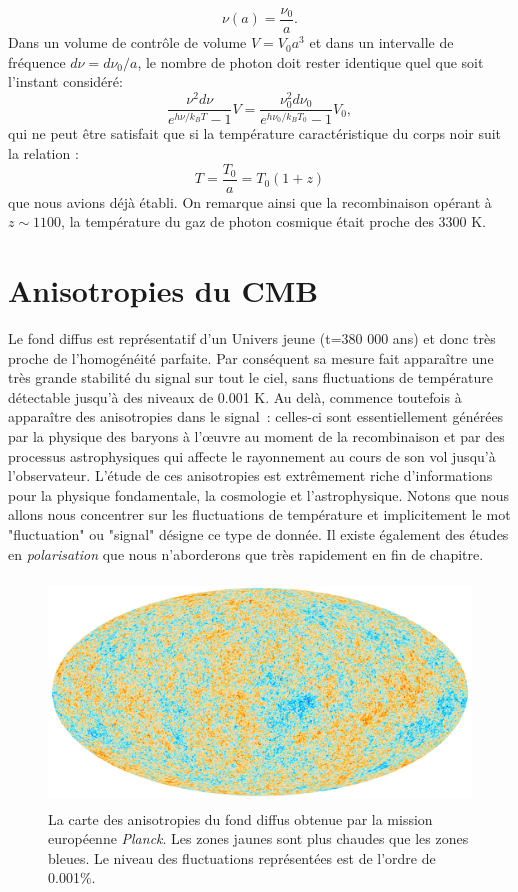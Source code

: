 \begin{equation}
\nu(a)=\frac{\nu_0}{a}.
\end{equation}
Dans un volume de contrôle de volume $V=V_0a^3$ et dans un intervalle de fréquence $d\nu=d\nu_0/a$, le nombre de photon doit rester identique quel que soit l'instant considéré:
\begin{equation}
\frac{\nu^2d\nu}{e^{h\nu/k_BT}-1}V=\frac{\nu_0^2d\nu_0}{e^{h\nu_0/k_BT_0}-1}V_0,
\end{equation}
qui ne peut être satisfait que si la température caractéristique du corps noir suit la relation :
\begin{equation}
T=\frac{T_0}{a}=T_0(1+z)
\end{equation}
que nous avions déjà établi. On remarque ainsi que la recombinaison opérant à $z\sim1100$, la température du gaz de photon cosmique était proche des 3300 K.

\section{Anisotropies du CMB}
Le fond diffus est représentatif d'un Univers jeune (t=380 000 ans) et donc très proche de l'homogénéité parfaite. Par conséquent sa mesure fait apparaître une très grande stabilité du signal sur tout le ciel, sans fluctuations de température détectable jusqu'à des niveaux de 0.001 K. Au delà, commence toutefois à apparaître des anisotropies dans le signal~: celles-ci sont essentiellement générées par la physique des baryons à l'œuvre au moment de la recombinaison et par des processus astrophysiques qui affecte le rayonnement au cours de son vol jusqu'à l'observateur. L'étude de ces anisotropies est extrêmement riche d'informations pour la physique fondamentale, la cosmologie et l'astrophysique. Notons que nous allons nous concentrer sur les fluctuations de température et implicitement le mot "fluctuation" ou "signal" désigne ce type de donnée. Il existe également des études en \textit{polarisation} que nous n'aborderons que très rapidement en fin de chapitre.

\begin{figure}[htbp]
	\centering
		\includegraphics[height=6cm]{figs/planck2015.png}
		\caption[Les fluctuations de températures vues par Planck]{La carte des anisotropies du fond diffus obtenue par la mission européenne \textit{Planck}. Les zones jaunes sont plus chaudes que les zones bleues. Le niveau des fluctuations représentées est de l'ordre de 0.001\%.}
	\label{f:planckmap}
\end{figure}

